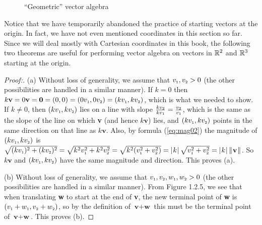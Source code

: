 \begin{figure}[h]
 \centering
 \qquad
 \qquad
 \caption[]{\quad ``Geometric'' vector algebra}
 \label{fig:pgram}
\end{figure}

Notice that we have temporarily abandoned the practice of starting vectors at the origin. In fact, we have not even
mentioned coordinates in this section so far. Since we will deal mostly with Cartesian coordinates in this book, the
following two theorems are useful for performing vector algebra on vectors in $\mathbb{R}^{2}$ and $\mathbb{R}^{3}$
starting at the origin.

\begin{proofbar}\vspace{-3mm}\begin{proof}[Proof:] (a)
 Without loss of generality, we assume that $v_{\scriptscriptstyle 1}, v_{\scriptscriptstyle 2} > 0$ (the other
 possibilities are handled in a similar manner). If $k = 0$ then $k\textbf{v} = 0\textbf{v} = \textbf{0} = (0,0)
 = (0v_{\scriptscriptstyle 1},0v_{\scriptscriptstyle 2}) = (kv_{\scriptscriptstyle 1},kv_{\scriptscriptstyle 2})$, which
 is what we needed to show. If $k \ne 0$, then $(kv_{\scriptscriptstyle 1},kv_{\scriptscriptstyle 2})$ lies on a line
 with slope $\frac{kv_{\scriptscriptstyle 2}}{kv_{\scriptscriptstyle 1}} =
 \frac{v_{\scriptscriptstyle 2}}{v_{\scriptscriptstyle 1}}$, which is the same as the slope of the line on which
 \textbf{v} (and hence $k\textbf{v}$) lies, and $(kv_{\scriptscriptstyle 1},kv_{\scriptscriptstyle 2})$ points in the
 same direction on that line as $k\textbf{v}$.  Also, by formula (\ref{eq:mag02}) the magnitude of
 $(kv_{\scriptscriptstyle 1},kv_{\scriptscriptstyle 2})$ is $\sqrt{(kv_{\scriptscriptstyle 1})^2 +
 (kv_{\scriptscriptstyle 2})^2} = \sqrt{k^2 v_{\scriptscriptstyle 1}^2 + k^2 v_{\scriptscriptstyle 2}^2} = \sqrt{k^2 (v_{\scriptscriptstyle 1}^2 + v_{\scriptscriptstyle 2}^2)} =
 \lvert\mspace{1mu}k\mspace{1mu}\rvert \,\sqrt{v_{\scriptscriptstyle 1}^2 + v_{\scriptscriptstyle 2}^2} = \lvert\mspace{1mu}k\mspace{1mu}\rvert \,\lVert\mspace{1mu}\textbf{v}\mspace{1mu}\rVert$.
 So $k\textbf{v}$ and $(kv_{\scriptscriptstyle 1},kv_{\scriptscriptstyle 2})$ have the same magnitude and direction.
 This proves (a).\vspace{1mm}
 
 \piccaption[]{}
 \par\noindent(b)
 Without loss of generality, we assume that $v_{\scriptscriptstyle 1}, v_{\scriptscriptstyle 2},
 w_{\scriptscriptstyle 1},w_{\scriptscriptstyle 2} > 0$ (the other possibilities are handled in a similar manner).
 From Figure 1.2.5, we see that when translating \textbf{w} to start at the end of \textbf{v}, the new
 terminal point of \textbf{w} is $(v_{\scriptscriptstyle 1} + w_{\scriptscriptstyle 1}, v_{\scriptscriptstyle 2} + w_{\scriptscriptstyle 2})$, so by the definition of $\textbf{v} + \textbf{w}$ this must
 be the terminal point of $\textbf{v} + \textbf{w}$. This proves (b).\vspace{-3mm}
\end{proof}\end{proofbar}
